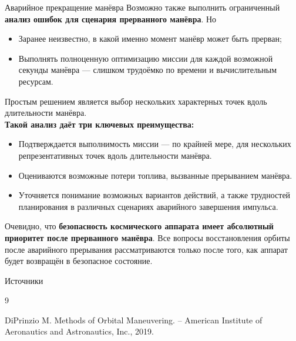 \documentclass[8pt]{beamer}
\begin{document}
\begin{frame}{Аварийное прекращение манёвра}
Возможно также выполнить ограниченный \textbf{анализ ошибок для сценария прерванного манёвра}. Но
\begin{itemize}
    \item Заранее неизвестно, в какой именно момент манёвр может быть прерван;
    \item Выполнять полноценную оптимизацию миссии для каждой возможной секунды манёвра — слишком трудоёмко по времени и вычислительным ресурсам.
\end{itemize}
Простым решением является выбор нескольких характерных точек вдоль длительности манёвра. \\
\smallskip
\textbf{Такой анализ даёт три ключевых преимущества:}
\begin{itemize}
    \item Подтверждается выполнимость миссии — по крайней мере, для нескольких репрезентативных точек вдоль длительности манёвра.
    \item Оцениваются возможные потери топлива, вызванные прерыванием манёвра.
    \item Уточняется понимание возможных вариантов действий, а также трудностей планирования в различных сценариях аварийного завершения импульса.
\end{itemize}
Очевидно, что \textbf{безопасность космического аппарата имеет абсолютный приоритет после прерванного манёвра}. Все вопросы восстановления орбиты после аварийного прерывания рассматриваются только после того, как аппарат будет возвращён в безопасное состояние.
\end{frame}

\begin{frame}[allowframebreaks]{Источники}
  \begin{thebibliography}{9}

    DiPrinzio M. Methods of Orbital Maneuvering. – American Institute of Aeronautics and Astronautics, Inc., 2019.
    
  \end{thebibliography}
\end{frame}
\end{document}
